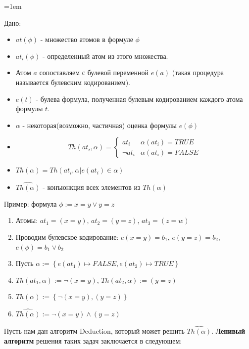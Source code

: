 \documentclass[12pt]{extreport}
\theoremstyle{definiton}
\theoremstyle{definition}
\theoremstyle{definition}
\newcommand{\solution}[2][\color{myblue}Ответ]{
\medskip
	\noindent{\bfseries #1 }{{\color{myblue}\bfseries #2:}}
}
\newenvironment{blockquote}{%
  \par%
  \medskip
  \leftskip=1em%
  \noindent}{%
  \par\medskip}
\begin{document}
\solution{9}
\begin{blockquote}
{\color{myblue}
\noindent 

Дано: 
\begin{itemize}
    \item $at(\phi)$ - множество атомов в формуле $\phi$
    \item $at_i(\phi)$ - определенный атом из этого множества.
    \item Атом $a$ сопоставляем с булевой переменной $e(a)$ (такая процедура называется булевским кодированием).
    \item $e(t)$ - булева формула, полученная булевым кодированием каждого атома формулы $t$.
    \item $\alpha$ - некоторая(возможно, частичная) оценка формулы $e(\phi)$
    \item 
    \begin{equation*}
        Th(at_i, \alpha) =
        \begin{cases}
          at_i & \alpha(at_i) = TRUE \\
          \neg at_i & \alpha(at_i) = FALSE
        \end{cases}
    \end{equation*}
    \item $Th(\alpha) = {Th(at_i, \alpha | e(at_i) \in \alpha)}$
    \item $\hat{Th(\alpha)}$ - конъюнкция всех элементов из $Th(\alpha)$
\end{itemize}

Пример: формула $\phi := x = y \vee y = z$

\begin{enumerate}
    \item Атомы: $at_1 = (x = y)$, $at_2 = (y = z)$, $at_3 = (z = w)$
    \item Проводим булевское кодирование: $e(x = y) = b_1$, $e(y = z) = b_2$, $e(\phi) = b_1 \vee b_2$
    \item Пусть $\alpha := \left\{e(at_1) \mapsto FALSE, e(at_2) \mapsto TRUE\right\}$
    \item $Th(at_1, \alpha) := \neg(x = y)$, $Th(at_2, \alpha) := (y = z)$
    \item $Th(\alpha) := \left\{\neg(x = y), (y = z)\right\}$
    \item $\hat{Th(\alpha)} := \neg(x = y) \wedge (y = z)$
\end{enumerate}

Пусть нам дан алгоритм Deduction, который может решить $\hat{Th(\alpha)}$.
\textbf{Ленивый алгоритм} решения таких задач заключается в следующем:

}
\end{blockquote}
\end{document}
